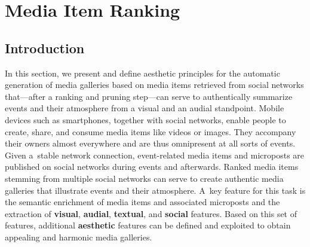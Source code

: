 

\chapter{Media Item Ranking}

\ifpdf
    \graphicspath{{7_media_item_ranking/figures/PNG/}{7_media_item_ranking/figures/PDF/}{7_media_item_ranking/figures/}}
\else
    \graphicspath{{7_media_item_ranking/figures/EPS/}{7_media_item_ranking/figures/}}
\fi


\section{Introduction}
In this section, we present and define aesthetic principles
for the automatic generation of media galleries
based on media items retrieved from social networks
that---after a ranking and pruning step---can serve to authentically
summarize events and their atmosphere from a visual
and an audial standpoint.
Mobile devices such as smartphones, together with social networks,
enable people to create, share, and consume media items
like videos or images.
They accompany their owners almost everywhere
and are thus omnipresent at all sorts of events.
Given a~stable network connection, event-related media items
and microposts are published on social networks
during events and afterwards.
Ranked media items stemming from multiple social networks
can serve to create authentic media galleries
that illustrate events and their atmosphere.
A~key feature for this task is the semantic enrichment
of media items and associated microposts
and the extraction of \textbf{visual}, \textbf{audial},
\textbf{textual}, and \textbf{social} features.
Based on this set of features,
additional \textbf{aesthetic} features
can be defined and exploited to obtain appealing
and harmonic media galleries.

